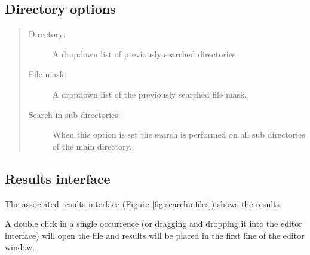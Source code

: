 \subsection{Directory options}
\begin{quote}
  \begin{footnotesize}
    \begin{description}
      \item[Directory:]
        A dropdown list of previously searched directories.
      \item[File mask:]
        A dropdown list of the previously searched file mask.
      \item[Search in sub directories:]
        When this option is set the search is performed on all sub
        directories of the main directory.
    \end{description}
  \end{footnotesize}
\end{quote}


\subsection{Results interface}
The associated results interface
(Figure \ref{fig:searchinfiles})
shows the results.

A double click in a single occurrence (or dragging and dropping it into the
editor interface) will open the file and results will be placed in the first
line of the editor window.
